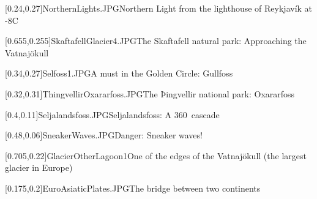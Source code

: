 



\graphicspath{{Figures/}{Figures/Iceland/}}


\subtitle{Day 1}
\date{07.10.2019}


    
    [0.24,0.27]{NorthernLights.JPG}{Northern Light from the lighthouse of Reykjav\'ik at -8\textdegree{}C}
    
    [0.655,0.255]{SkaftafellGlacier4.JPG}{The Skaftafell natural park: Approaching the Vatnaj\"okull}
    
    [0.34,0.27]{Selfoss1.JPG}{A must in the Golden Circle: Gullfoss}
    
    [0.32,0.31]{ThingvellirOxararfoss.JPG}{The Þingvellir national park: Oxararfoss}
    
    [0.4,0.11]{Seljalandsfoss.JPG}{Seljalandsfoss: A 360\textdegree\ cascade}
    
    
    [0.48,0.06]{SneakerWaves.JPG}{Danger: Sneaker waves!}
    
    [0.705,0.22]{GlacierOtherLagoon1}{One of the edges of the Vatnaj\"okull (the largest glacier in Europe)}
    
    [0.175,0.2]{EuroAsiaticPlates.JPG}{The bridge between two continents}
    

